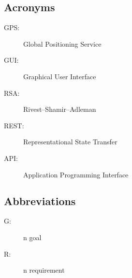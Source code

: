 \documentclass[../../DD.tex]{subfiles}
\begin{document}
		\subsection{Acronyms}
		\begin{description}
		\item[GPS:]Global Positioning Service
		\item[GUI:]Graphical User Interface
		\item[RSA:]Rivest–Shamir–Adleman
		\item[REST:]Representational State Transfer
		\item[API:]Application Programming Interface
		\end{description}
		\subsection{Abbreviations}
		\begin{description}
			 \item[G:]n goal
			 \item[R:]n requirement
			
		\end{description}
		
\end{document}
